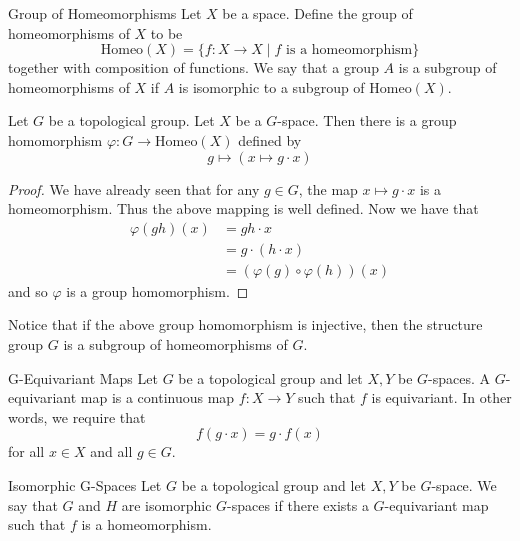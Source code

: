 \documentclass[a4paper]{article}
\begin{document}
\begin{defn}{Group of Homeomorphisms}{} Let $X$ be a space. Define the group of homeomorphisms of $X$ to be $$\text{Homeo}(X)=\{f:X\to X\;|\;f\text{ is a homeomorphism}\}$$ together with composition of functions. We say that a group $A$ is a subgroup of homeomorphisms of $X$ if $A$ is isomorphic to a subgroup of $\text{Homeo}(X)$. 
\end{defn}

\begin{lmm}{}{} Let $G$ be a topological group. Let $X$ be a $G$-space. Then there is a group homomorphism $\varphi:G\to\text{Homeo}(X)$ defined by $$g\mapsto\left(x\mapsto g\cdot x\right)$$ \tcbline
\begin{proof}
We have already seen that for any $g\in G$, the map $x\mapsto g\cdot x$ is a homeomorphism. Thus the above mapping is well defined. Now we have that 
\begin{align*}
\varphi(gh)(x)&=gh\cdot x\\
&=g\cdot(h\cdot x)\\
&=(\varphi(g)\circ\varphi(h))(x)
\end{align*}
and so $\varphi$ is a group homomorphism. 
\end{proof}
\end{lmm}

Notice that if the above group homomorphism is injective, then the structure group $G$ is a subgroup of homeomorphisms of $G$. 

\begin{defn}{G-Equivariant Maps}{} Let $G$ be a topological group and let $X,Y$ be $G$-spaces. A $G$-equivariant map is a continuous map $f:X\to Y$ such that $f$ is equivariant. In other words, we require that $$f(g\cdot x)=g\cdot f(x)$$ for all $x\in X$ and all $g\in G$. 
\end{defn}

\begin{defn}{Isomorphic G-Spaces}{} Let $G$ be a topological group and let $X,Y$ be $G$-space. We say that $G$ and $H$ are isomorphic $G$-spaces if there exists a $G$-equivariant map such that $f$ is a homeomorphism. 
\end{defn}
\end{document}

